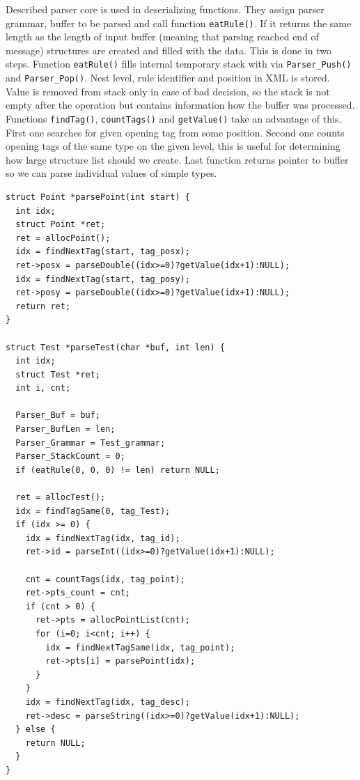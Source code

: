 \documentclass[12pt,notitlepage]{report}
\begin{document}
Described parser core is used in deserializing functions. They assign parser grammar, buffer to be parsed and call function \texttt{eatRule()}. If it returns the same length as the length of input buffer (meaning that parsing reached end of message) structures are created and filled with the data. This is done in two steps. Function \texttt{eatRule()} fills internal temporary stack with via \texttt{Parser\_Push()} and \texttt{Parser\_Pop()}. Nest level, rule identifier and position in XML is stored. Value is removed from stack only in case of bad decision, so the stack is not empty after the operation but contains information how the buffer was processed. Functions \texttt{findTag()}, \texttt{countTags()} and \texttt{getValue()} take an advantage of this. First one searches for given opening tag from some position. Second one counts opening tags of the same type on the given level, this is useful for determining how large structure list should we create. Last function returns pointer to buffer so we can parse individual values of simple types.

\begin{small}
\begin{lstlisting}
struct Point *parsePoint(int start) {
  int idx;
  struct Point *ret;
  ret = allocPoint();
  idx = findNextTag(start, tag_posx);
  ret->posx = parseDouble((idx>=0)?getValue(idx+1):NULL);
  idx = findNextTag(start, tag_posy);
  ret->posy = parseDouble((idx>=0)?getValue(idx+1):NULL);
  return ret;
}

struct Test *parseTest(char *buf, int len) {
  int idx;
  struct Test *ret;
  int i, cnt;

  Parser_Buf = buf;
  Parser_BufLen = len;
  Parser_Grammar = Test_grammar;
  Parser_StackCount = 0;
  if (eatRule(0, 0, 0) != len) return NULL;

  ret = allocTest();
  idx = findTagSame(0, tag_Test);
  if (idx >= 0) {
    idx = findNextTag(idx, tag_id);
    ret->id = parseInt((idx>=0)?getValue(idx+1):NULL);

    cnt = countTags(idx, tag_point);
    ret->pts_count = cnt;
    if (cnt > 0) {
      ret->pts = allocPointList(cnt);
      for (i=0; i<cnt; i++) {
        idx = findNextTagSame(idx, tag_point);
        ret->pts[i] = parsePoint(idx);
      }
    }
    idx = findNextTag(idx, tag_desc);
    ret->desc = parseString((idx>=0)?getValue(idx+1):NULL);
  } else {
    return NULL;
  }
}
\end{lstlisting}
\end{small}
\end{document}
